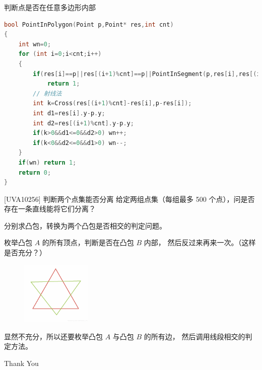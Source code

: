 \documentclass{beamer}
\begin{document}
\begin{frame}[fragile]{判断点是否在任意多边形内部}
    \small
    \begin{lstlisting}[language=c++]
bool PointInPolygon(Point p,Point* res,int cnt)
{
    int wn=0;
    for (int i=0;i<cnt;i++)
    {
        if(res[i]==p||res[(i+1)%cnt]==p||PointInSegment(p,res[i],res[(i+1)%cnt]))
            return 1;
        // 射线法
        int k=Cross(res[(i+1)%cnt]-res[i],p-res[i]);
        int d1=res[i].y-p.y;
        int d2=res[(i+1)%cnt].y-p.y;
        if(k>0&&d1<=0&&d2>0) wn++;
        if(k<0&&d2<=0&&d1>0) wn--;
    }
    if(wn) return 1;
    return 0;
}
    \end{lstlisting}
\end{frame}

\begin{frame}{[UVA10256] 判断两个点集能否分离}
    \small
    给定两组点集（每组最多 500 个点），问是否存在一条直线能将它们分离？

    \vspace{1em}\pause
    分别求凸包，转换为两个凸包是否相交的判定问题。

    \vspace{1em}\pause
    枚举凸包 $A$ 的所有顶点，判断是否在凸包 $B$ 内部，
    然后反过来再来一次。（这样是否充分？）

    \pause
    \begin{figure}[H]
        \centering
        \includegraphics[width=0.3\textwidth]{pic/convexInsect.png}
    \end{figure}

    显然不充分，所以还要枚举凸包 $A$ 与凸包 $B$ 的所有边，
    然后调用线段相交的判定方法。
\end{frame}

\begin{frame}
    \begin{center}
        {\Huge\calligra Thank You}
    \end{center}
\end{frame}
\end{document}
